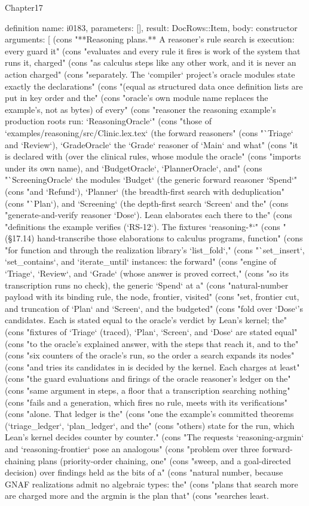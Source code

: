 \begin{lexlean}{Chapter17}
\begin{semanticmodule}
definition{
  name: i0183,
  parameters: [],
  result: DocRows::Item,
  body: constructor{
    arguments: [
      (cons "**Reasoning plans.** A reasoner's rule search is execution: every guard it" (cons "evaluates and every rule it fires is work of the system that runs it, charged" (cons "as calculus steps like any other work, and it is never an action charged" (cons "separately. The `compiler` project's oracle modules state exactly the declarations" (cons "(equal as structured data once definition lists are put in key order and the" (cons "oracle's own module name replaces the example's, not as bytes) of every" (cons "reasoner the reasoning example's production roots run: `ReasoningOracle`" (cons "those of `examples/reasoning/src/Clinic.lex.tex` (the forward reasoners" (cons "`Triage` and `Review`), `GradeOracle` the `Grade` reasoner of `Main` and what" (cons "it is declared with (over the clinical rules, whose module the oracle" (cons "imports under its own name), and `BudgetOracle`, `PlannerOracle`, and" (cons "`ScreeningOracle` the modules `Budget` (the generic forward reasoner `Spend`" (cons "and `Refund`), `Planner` (the breadth-first search with deduplication" (cons "`Plan`), and `Screening` (the depth-first search `Screen` and the" (cons "generate-and-verify reasoner `Dose`). Lean elaborates each there to the" (cons "definitions the example verifies (`RS-12`). The fixtures `reasoning-*`" (cons "(§17.14) hand-transcribe those elaborations to calculus programs, function" (cons "for function and through the realization library's `list_fold`," (cons "`set_insert`, `set_contains`, and `iterate_until` instances: the forward" (cons "engine of `Triage`, `Review`, and `Grade` (whose answer is proved correct," (cons "so its transcription runs no check), the generic `Spend` at a" (cons "natural-number payload with its binding rule, the node, frontier, visited" (cons "set, frontier cut, and truncation of `Plan` and `Screen`, and the budgeted" (cons "fold over `Dose`'s candidates. Each is stated equal to the oracle's verdict by Lean's kernel; the" (cons "fixtures of `Triage` (traced), `Plan`, `Screen`, and `Dose` are stated equal" (cons "to the oracle's explained answer, with the steps that reach it, and to the" (cons "six counters of the oracle's run, so the order a search expands its nodes" (cons "and tries its candidates in is decided by the kernel. Each charges at least" (cons "the guard evaluations and firings of the oracle reasoner's ledger on the" (cons "same argument in steps, a floor that a transcription searching nothing" (cons "fails and a generation, which fires no rule, meets with its verifications" (cons "alone. That ledger is the" (cons "one the example's committed theorems (`triage_ledger`, `plan_ledger`, and the" (cons "others) state for the run, which Lean's kernel decides counter by counter." (cons "The requests `reasoning-argmin` and `reasoning-frontier` pose an analogous" (cons "problem over three forward-chaining plans (priority-order chaining, one" (cons "sweep, and a goal-directed decision) over findings held as the bits of a" (cons "natural number, because GNAF realizations admit no algebraic types: the" (cons "plans that search more are charged more and the argmin is the plan that" (cons "searches least. }}
\end{semanticmodule}
\end{lexlean}
